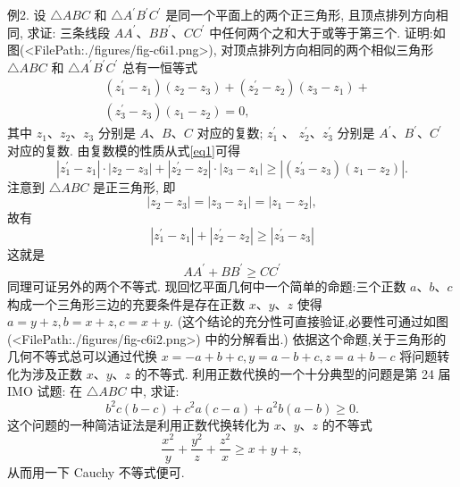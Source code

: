 例2. 设 $\triangle A B C$ 和 $\triangle A^{\prime} B^{\prime} C^{\prime}$ 是同一个平面上的两个正三角形, 且顶点排列方向相同, 求证: 三条线段 $A A^{\prime} 、 B B^{\prime} 、 C C^{\prime}$ 中任何两个之和大于或等于第三个.
证明:如图(<FilePath:./figures/fig-c6i1.png>), 对顶点排列方向相同的两个相似三角形 $\triangle A B C$ 和 $\triangle A^{\prime} B^{\prime} C^{\prime}$ 总有一恒等式
$$
\begin{aligned}
& \left(z_1^{\prime}-z_1\right)\left(z_2-z_3\right)+\left(z_2^{\prime}-z_2\right)\left(z_3-z_1\right)+ \\
& \left(z_3^{\prime}-z_3\right)\left(z_1-z_2\right)=0, \label{eq1}
\end{aligned}
$$
其中 $z_1 、 z_2 、 z_3$ 分别是 $A 、 B 、 C$ 对应的复数; $z_1^{\prime}$ 、 $z_2^{\prime} 、 z_3^{\prime}$ 分别是 $A^{\prime} 、 B^{\prime} 、 C^{\prime}$ 对应的复数.
由复数模的性质从式\ref{eq1}可得
$$
\left|z_1^{\prime}-z_1\right| \cdot\left|z_2-z_3\right|+\left|z_2^{\prime}-z_2\right| \cdot\left|z_3-z_1\right| \geqslant\left|\left(z_3^{\prime}-z_3\right)\left(z_1-z_2\right)\right| .
$$
注意到 $\triangle A B C$ 是正三角形, 即
$$
\left|z_2-z_3\right|=\left|z_3-z_1\right|=\left|z_1-z_2\right|,
$$
故有
$$
\left|z_1^{\prime}-z_1\right|+\left|z_2^{\prime}-z_2\right| \geqslant\left|z_3^{\prime}-z_3\right|
$$
这就是
$$
A A^{\prime}+B B^{\prime} \geqslant C C^{\prime}
$$
同理可证另外的两个不等式.
现回忆平面几何中一个简单的命题:三个正数 $a 、 b 、 c$ 构成一个三角形三边的充要条件是存在正数 $x 、 y 、 z$ 使得 $a=y+z, b=x+z, c=x+y$. (这个结论的充分性可直接验证,必要性可通过如图(<FilePath:./figures/fig-c6i2.png>) 中的分解看出.)
依据这个命题,关于三角形的几何不等式总可以通过代换 $x=-a+b+c, y=a-b+c, z=a+b-c$ 将问题转化为涉及正数 $x 、 y 、 z$ 的不等式.
利用正数代换的一个十分典型的问题是第 24 届 IMO 试题:
在 $\triangle A B C$ 中, 求证:
$$
b^2 c(b-c)+c^2 a(c-a)+a^2 b(a-b) \geqslant 0 .
$$
这个问题的一种简洁证法是利用正数代换转化为 $x 、 y 、 z$ 的不等式
$$
\frac{x^2}{y}+\frac{y^2}{z}+\frac{z^2}{x} \geqslant x+y+z,
$$
从而用一下 Cauchy 不等式便可.



